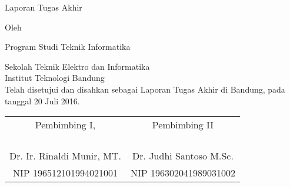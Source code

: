 \clearpage
\pagestyle{empty}

\begin{center}
\smallskip

    \Large \bfseries \MakeUppercase{\thetitle}
    \vfill

    \Large Laporan Tugas Akhir
    \vfill

    \large Oleh

    \Large \theauthor

    \Large Program Studi Teknik Informatika

    \large \normalfont Sekolah Teknik Elektro dan Informatika \\
    Institut Teknologi Bandung \\

    \vfill
    \large \normalfont
    Telah disetujui dan disahkan sebagai Laporan Tugas Akhir di Bandung, pada tanggal 20 Juli 2016.

    \vfill
    \setlength{\tabcolsep}{12pt}
    \begin{tabular}{c@{\hskip 0.5in}c}
        Pembimbing I, & Pembimbing II \\
        & \\
        & \\
        & \\
        & \\
        Dr. Ir. Rinaldi Munir, MT. & Dr. Judhi Santoso M.Sc. \\
        NIP 196512101994021001 & NIP 196302041989031002 \\
    \end{tabular}

\end{center}
\clearpage
